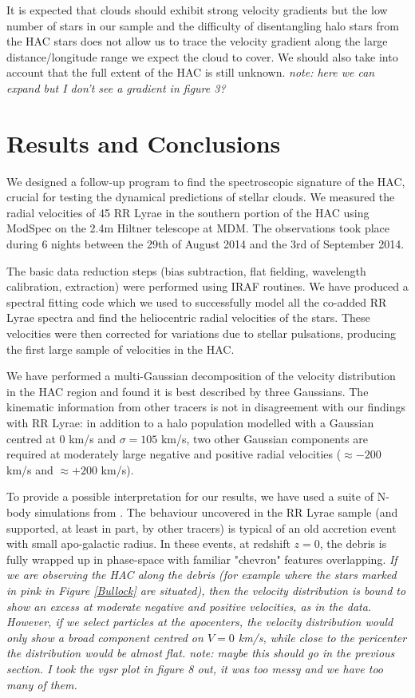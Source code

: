 \documentclass[useAMS,usenatbib]{mn2e}
\begin{document}
It is expected that clouds should exhibit strong velocity gradients \citep[e.g.][]{Jo2012} but the low number of stars in our sample and the difficulty of disentangling halo stars from the HAC stars does not allow us to trace the velocity gradient along the large distance/longitude range we expect the cloud to cover. We should also take into account that the full extent of the HAC is still unknown. \textit{note: here we can expand but I don't see a gradient in figure 3?}
%
\section{Results and Conclusions}
We designed a follow-up program to find the spectroscopic signature of the HAC, crucial for testing the dynamical predictions of stellar clouds. We measured the radial velocities of 45 RR Lyrae in the  southern portion of the HAC using ModSpec on the 2.4m Hiltner telescope at MDM. The observations took place during 6 nights between the 29th of August 2014 and the 3rd of September 2014. 

The basic data reduction steps (bias subtraction, flat fielding, wavelength calibration, extraction) were performed using IRAF routines. We have produced a spectral fitting code which we used to successfully model all the co-added RR Lyrae spectra and find the heliocentric radial velocities of the stars. These velocities were then corrected for variations due to stellar pulsations, producing the first large sample of velocities in the HAC. 

We have performed a multi-Gaussian decomposition of the velocity distribution in the HAC region and found it is best described by three Gaussians. The kinematic information from other tracers is not in disagreement with our findings with RR Lyrae: in addition to a halo population modelled with a Gaussian centred at 0 km/s and $\sigma = 105$ km/s, two other Gaussian components are required at moderately large negative and positive radial velocities ($\approx -200$ km/s and $\approx +200$ km/s).

To provide a possible interpretation for our results, we have used a suite of N-body simulations from \citet{Jo08}. The behaviour uncovered in the RR Lyrae sample (and supported, at least in part, by other tracers) is typical of an old accretion event with small apo-galactic radius. In these events, at redshift $z=0$, the debris is fully wrapped up in phase-space with familiar "chevron" features overlapping. \textit{If we are observing the HAC along the debris (for example where the stars marked in pink in Figure \ref{Bullock} are situated), then the velocity distribution is bound to show an excess at moderate negative and positive velocities, as in the data. However, if we select particles at the apocenters, the velocity distribution would only show a broad component centred on $V = 0$ km/s, while close to the pericenter the distribution would be almost flat. note: maybe this should go in the previous section. I took the vgsr plot in figure 8 out, it was too messy and we have too many of them.}
\end{document}
